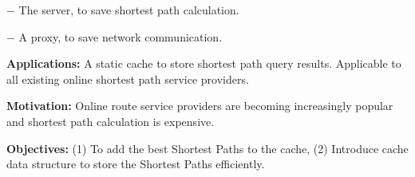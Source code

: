 \documentclass[a3shrink,landscape, final]{baposter}
\begin{document}
\begin{poster}
{  \begin{indentpar}{0.5cm}
	  $-$ The server, to save shortest path calculation.

	  $-$ A proxy, to save network communication.
   \end{indentpar}


  \textbf{Applications:} A static cache to store shortest path query results. Applicable to all existing online shortest path service providers.

  \textbf{Motivation:} Online route service providers are becoming increasingly popular and shortest path calculation is expensive. %

  \textbf{Objectives:} (1) To add the best Shortest Paths to the cache, (2) Introduce cache data structure to store the Shortest Paths efficiently.

  \vspace{0.5em}
 }



% 
% 
% 

\end{poster}
\end{document}
